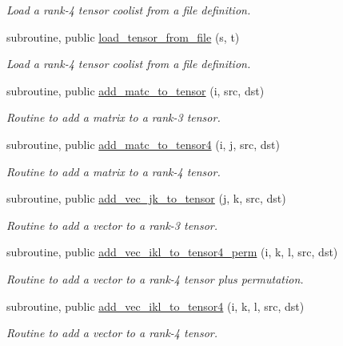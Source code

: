 \begin{DoxyCompactItemize}
\begin{DoxyCompactList}\small\item\em Load a rank-\/4 tensor coolist from a file definition. \end{DoxyCompactList}\item 
subroutine, public \hyperlink{namespacetensor_ac4c6ebce7aee73aebac2514e45f7cc78}{load\+\_\+tensor\+\_\+from\+\_\+file} (s, t)
\begin{DoxyCompactList}\small\item\em Load a rank-\/4 tensor coolist from a file definition. \end{DoxyCompactList}\item 
subroutine, public \hyperlink{namespacetensor_a4c63a1dd16bf751220f016b41bdaa78c}{add\+\_\+matc\+\_\+to\+\_\+tensor} (i, src, dst)
\begin{DoxyCompactList}\small\item\em Routine to add a matrix to a rank-\/3 tensor. \end{DoxyCompactList}\item 
subroutine, public \hyperlink{namespacetensor_ab32e3f9d0aab15d2fa34dc3e509ee8bf}{add\+\_\+matc\+\_\+to\+\_\+tensor4} (i, j, src, dst)
\begin{DoxyCompactList}\small\item\em Routine to add a matrix to a rank-\/4 tensor. \end{DoxyCompactList}\item 
subroutine, public \hyperlink{namespacetensor_aaa98410f224bc3dfb96cd7031f56e916}{add\+\_\+vec\+\_\+jk\+\_\+to\+\_\+tensor} (j, k, src, dst)
\begin{DoxyCompactList}\small\item\em Routine to add a vector to a rank-\/3 tensor. \end{DoxyCompactList}\item 
subroutine, public \hyperlink{namespacetensor_a9e443c5b0f095efdbb0df2e876b760be}{add\+\_\+vec\+\_\+ikl\+\_\+to\+\_\+tensor4\+\_\+perm} (i, k, l, src, dst)
\begin{DoxyCompactList}\small\item\em Routine to add a vector to a rank-\/4 tensor plus permutation. \end{DoxyCompactList}\item 
subroutine, public \hyperlink{namespacetensor_a4dd51ee85d6dffa3350880defc9823e8}{add\+\_\+vec\+\_\+ikl\+\_\+to\+\_\+tensor4} (i, k, l, src, dst)
\begin{DoxyCompactList}\small\item\em Routine to add a vector to a rank-\/4 tensor. \end{DoxyCompactList}\item 

\end{DoxyCompactItemize}
